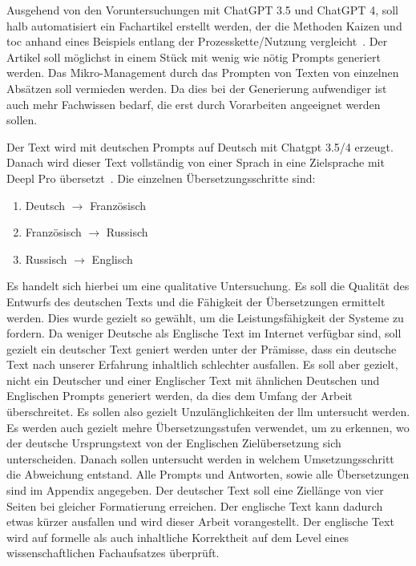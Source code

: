 
Ausgehend von den Voruntersuchungen mit ChatGPT 3.5 und ChatGPT 4, soll halb automatisiert ein Fachartikel erstellt werden,
der die Methoden Kaizen und \gls{toc} anhand eines Beispiels entlang der Prozesskette/Nutzung vergleicht~\cite{noauthor_chatgpt_nodate}.
Der Artikel soll möglichst in einem Stück mit wenig wie nötig Prompts generiert werden. Das Mikro-Management durch das Prompten von Texten von einzelnen Absätzen soll vermieden werden. Da dies bei der Generierung aufwendiger ist auch mehr Fachwissen bedarf, die erst durch Vorarbeiten angeeignet werden sollen.

Der Text wird mit deutschen Prompts auf Deutsch mit Chatgpt 3.5/4 erzeugt. Danach wird dieser Text vollständig von einer Sprach in eine Zielsprache mit Deepl Pro übersetzt~\cite{noauthor_deepl_nodate}.
Die einzelnen Übersetzungsschritte sind:

\begin{enumerate}
	\item Deutsch $\rightarrow$ Französisch
	\item Französisch $\rightarrow$ Russisch
	\item Russisch $\rightarrow$ Englisch
\end{enumerate}

Es handelt sich hierbei um eine qualitative Untersuchung. Es soll die Qualität des Entwurfs des deutschen Texts und die Fähigkeit der Übersetzungen ermittelt werden. Dies wurde gezielt so gewählt, um die Leistungsfähigkeit der Systeme zu fordern. Da weniger Deutsche als Englische Text im Internet verfügbar sind, soll gezielt ein deutscher Text geniert werden unter der Prämisse, dass ein deutsche Text nach unserer Erfahrung inhaltlich schlechter ausfallen. Es soll aber gezielt, nicht ein Deutscher und einer Englischer Text mit ähnlichen Deutschen und Englischen Prompts generiert werden, da dies dem Umfang der Arbeit überschreitet. Es sollen also gezielt Unzulänglichkeiten der \gls{llm} untersucht werden.
Es werden auch gezielt mehre Übersetzungsstufen verwendet, um zu erkennen, wo der deutsche Ursprungstext von der Englischen Zielübersetzung sich unterscheiden. Danach sollen untersucht werden in welchem Umsetzungsschritt die Abweichung entstand.
Alle Prompts und Antworten, sowie alle Übersetzungen sind im Appendix angegeben.
Der deutscher Text soll eine Ziellänge von vier Seiten bei gleicher Formatierung erreichen. Der englische Text kann dadurch etwas kürzer ausfallen und wird dieser Arbeit vorangestellt.
Der englische Text wird auf formelle als auch inhaltliche Korrektheit auf dem Level eines wissenschaftlichen Fachaufsatzes überprüft.

